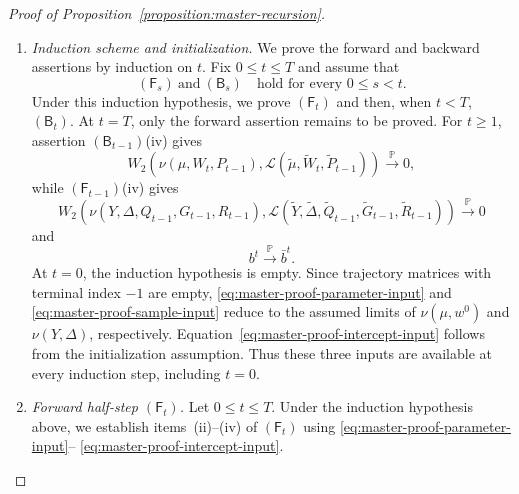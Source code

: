 \begin{proof}[Proof of Proposition~\ref{proposition:master-recursion}]
\begin{enumerate}[wide]
    \item \emph{Induction scheme and initialization.}
    We prove the forward and backward assertions by induction on $t$.
    Fix $0\leq t\leq T$ and assume that
    \[
        (\mathsf F_s)\ \text{and}\ (\mathsf B_s)
        \quad\text{hold for every }0\leq s<t.
    \]
    Under this induction hypothesis, we prove
    $(\mathsf F_t)$ and then, when $t<T$, $(\mathsf B_t)$.
    At $t=T$, only the forward assertion remains to be proved.
    For $t\geq1$, assertion $(\mathsf B_{t-1})$(iv) gives
    \begin{equation}
        W_2\left(
            \nu(\mu,W_t,P_{t-1}),
            \mathscr L(\tilde\mu,\tilde W_t,\tilde P_{t-1})
        \right)
        \xrightarrow{\mathbb P}0,
        \label{eq:master-proof-parameter-input}
    \end{equation}
    while $(\mathsf F_{t-1})$(iv) gives
    \begin{equation}
        W_2\left(
            \nu(Y,\Delta,Q_{t-1},G_{t-1},R_{t-1}),
            \mathscr L(
                \tilde Y,\tilde\Delta,
                \tilde Q_{t-1},\tilde G_{t-1},\tilde R_{t-1}
            )
        \right)
        \xrightarrow{\mathbb P}0
        \label{eq:master-proof-sample-input}
    \end{equation}
    and
    \begin{equation}
        b^t\xrightarrow{\mathbb P}\bar b^t.
        \label{eq:master-proof-intercept-input}
    \end{equation}
    At $t=0$, the induction hypothesis is empty.
    Since trajectory matrices with terminal index $-1$ are empty,
    \eqref{eq:master-proof-parameter-input} and
    \eqref{eq:master-proof-sample-input} reduce to the assumed
    limits of $\nu(\mu,w^0)$ and $\nu(Y,\Delta)$, respectively.
    Equation~\eqref{eq:master-proof-intercept-input} follows
    from the initialization assumption.
    Thus these three inputs are available at every induction
    step, including $t=0$.
    
    \item \emph{Forward half-step $(\mathsf F_t)$.} Let $0\leq t\leq T$.
    Under the induction hypothesis above, we establish
    items~(ii)--(iv) of $(\mathsf F_t)$ using
    \eqref{eq:master-proof-parameter-input}--%
    \eqref{eq:master-proof-intercept-input}.
    

\end{enumerate}
\end{proof}
